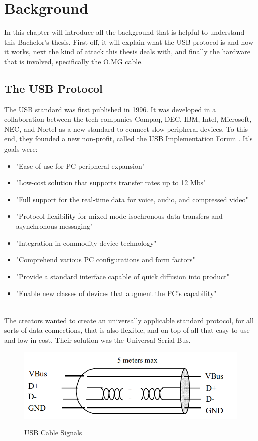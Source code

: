 \chapter{Background}


In this chapter will introduce all the background that is helpful to understand this Bachelor's thesis. 
First off, it will explain what the USB protocol is and how it works, next the kind of attack this thesis deals with, and finally the hardware that is involved, specifically the O.MG cable. 

\section{The USB Protocol} \label{TheUSBProtocol}

The USB standard \cite{WaybackMachine2018} was first published in 1996. It was developed in a collaboration between the tech companies Compaq, DEC, IBM, Intel, Microsoft, NEC, and Nortel as a new standard to connect slow peripheral devices. To this end, they founded a new non-profit, called the USB Implementation Forum \cite{USBIFUSBIF}. It's goals were:
\begin{itemize}
    \item "Ease of use for PC peripheral expansion"
    \item "Low-cost solution that supports transfer rates up to 12 Mbs"
    \item "Full support for the real-time data for voice, audio, and compressed video"
    \item "Protocol flexibility for mixed-mode isochronous data transfers and asynchronous messaging"
    \item "Integration in commodity device technology"
    \item "Comprehend various PC configurations and form factors"
    \item "Provide a standard interface capable of quick diffusion into product"
    \item "Enable new classes of devices that augment the PC's capability"  
\end{itemize}
\cite[p.~23]{WaybackMachine2018}\\
The creators wanted to create an universally applicable standard protocol, for all sorts of data connections, that is also flexible, and on top of all that easy to use and low in cost. Their solution was the Universal Serial Bus.

\begin{figure}
    \centering
    \includegraphics[width=0.5\linewidth]{usbsingalgraphic.png}
    \caption{USB Cable Signals}
    \label{fig:usbsingalgraphic}
    \cite{WaybackMachine2018}
\end{figure}

